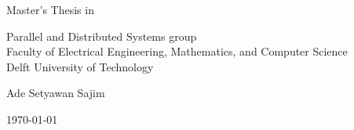 \begin{titlepage}

  \begin{center}
  \null\vfill
    \begin{center}
    \LARGE{\reportTitle}
    \end{center}

    \vspace{3cm}

    \begin{large}
    Master's Thesis in \reportMSC
    \end{large}

    \vspace{1.5cm}

    \begin{normalsize}
    Parallel and Distributed Systems group\\
    Faculty of Electrical Engineering, Mathematics, and Computer Science\\
    Delft University of Technology
    \end{normalsize}

    \vspace{2.0cm}

    \begin{normalsize}
    Ade Setyawan Sajim
    \end{normalsize}

    \vspace{1.0cm}

    \today            %

  \vfill
  \end{center}

\end{titlepage}
